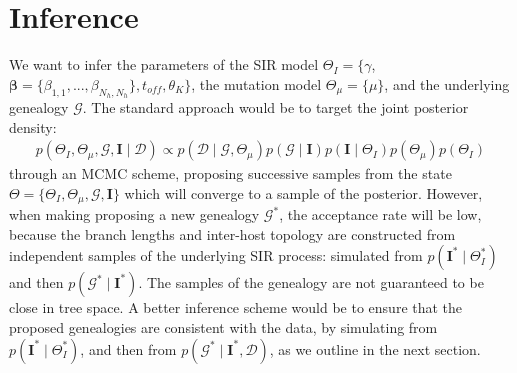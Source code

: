 \documentclass[a4paper,18pt]{report}
\begin{document}
\section{Inference}
We want to infer the parameters of the SIR model $\Theta_{I} = \{\gamma$, $\boldsymbol{\beta}= \{\beta_{1,1},...,\beta_{N_h,N_h}\}, t_{off}, \theta_K\}$, the mutation model $\Theta_{\mu} = \{\mu\}$, and the underlying genealogy $\mathcal{G}$. The standard approach would be to target the joint posterior density:
\begin{eqnarray}
p(\Theta_{I}, \Theta_{\mu}, \mathcal{G}, \mathbf{I} \mid \mathcal{D})\propto p(\mathcal{D}\mid \mathcal{G}, \Theta_{\mu})p(\mathcal{G}\mid \mathbf{I}) p(\mathbf{I} \mid \Theta_{I}) p(\Theta_{\mu}) p(\Theta_{I})
\end{eqnarray}
through an MCMC scheme, proposing successive samples from the state $\Theta=\{\Theta_{I}, \Theta_{\mu}, \mathcal{G}, \mathbf{I} \}$ which will converge to a sample of the posterior. However, when making proposing a new genealogy $\mathcal{G}^*$, the acceptance rate will be low, because the branch lengths and inter-host topology are 
constructed from independent samples of the underlying SIR process: simulated from $p(\mathbf{I}^* \mid \Theta_I^*)$ and then $p(\mathcal{G}^* \mid \mathbf{I}^*)$. 
The samples of the genealogy are not guaranteed to be close in tree space. A better inference scheme would be to ensure that the proposed genealogies are consistent with the data,
by simulating from $p(\mathbf{I}^* \mid \Theta_I^*)$, and then from $p(\mathcal{G}^* \mid \mathbf{I}^*, \mathcal{D})$, as we outline in the next section.
\end{document}
